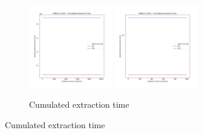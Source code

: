 \begin{figure}
    \centering
    \begin{subfigure}[b]{\textwidth}
        \centering
        \includegraphics[width=0.40\textwidth]{./fragments/04_experimental_execution/images/01_basebenchmark_04_single_class.png.0_0.png}
        \includegraphics[width=0.40\textwidth]{./fragments/04_experimental_execution/images/01_basebenchmark_04_single_class.png.0_1.png}
        \caption{Cumulated extraction time}
        \label{FIG:BENCHMARK_04_SINGLE_CLASS__0_0}
    \end{subfigure}


\end{figure}
